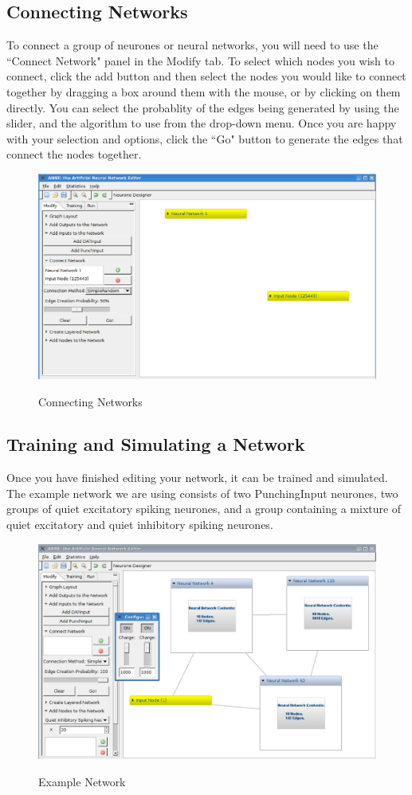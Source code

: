 \documentclass[11pt]{report}
\begin{document}
\subsection{Connecting Networks}
{
To connect a group of neurones or neural networks, you will need to use the ``Connect Network" panel in the Modify tab. To select which nodes you wish to connect, click the add button and then select the nodes you would like to connect together by dragging a box around them with the mouse, or by clicking on them directly. You can select the probablity of the edges being generated by using the slider, and the algorithm to use from the drop{}-down menu. Once you are happy with your selection and options, click the ``Go" button to generate the edges that connect the nodes together.

\begin{figure}[t]
\centering
\scalebox{0.4} {
	\includegraphics{connect}
}
\caption{Connecting Networks}
\label{fig:connect}
\end{figure}
}
\newpage
\subsection{Training and Simulating a Network}
{
Once you have finished editing your network, it can be trained and simulated. The example network we are using consists of two PunchingInput neurones, two groups of quiet excitatory spiking neurones, and a group containing a mixture of quiet excitatory and quiet inhibitory spiking neurones.

\begin{figure}[t]
\centering
\scalebox{0.4} {
	\includegraphics{example}
}
\caption{Example Network}
\label{fig:eg}
\end{figure}
}
\newpage
\end{document}
